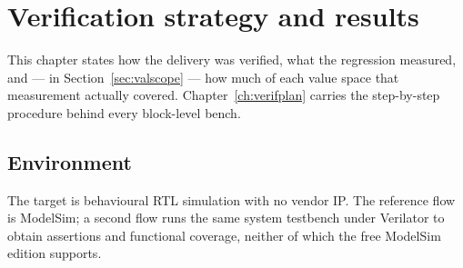 \chapter{Verification strategy and results}
\label{ch:verif}

This chapter states how the delivery was verified, what the regression measured,
and --- in Section~\ref{sec:valscope} --- how much of each value space that
measurement actually covered. Chapter~\ref{ch:verifplan} carries the
step-by-step procedure behind every block-level bench.

\section{Environment}

The target is behavioural RTL simulation with no vendor IP. The reference flow is
ModelSim; a second flow runs the same system testbench under Verilator to obtain
assertions and functional coverage, neither of which the free ModelSim edition
supports.

